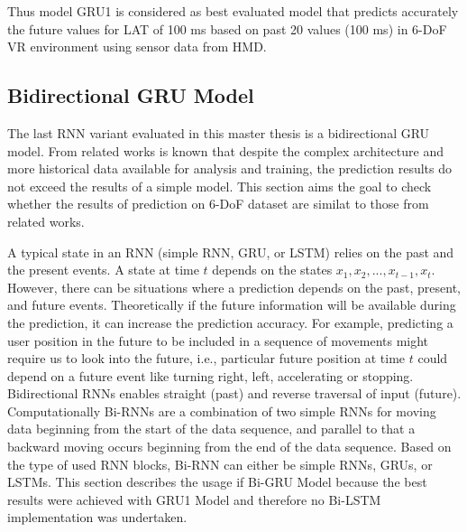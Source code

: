 Thus model GRU1 is considered as best evaluated model that predicts accurately the future values for LAT of 100 ms based on past 20 values (100 ms) in 6-DoF VR environment using sensor data from HMD.

\subsection{Bidirectional GRU Model}
\label{sec:impl:model:arch:bi-gru}

The last RNN variant evaluated in this master thesis is a bidirectional GRU model. From related works is known that despite the complex architecture and more historical data available for analysis and training, the prediction results do not exceed the results of a simple model. This section aims the goal to check whether the results of prediction on 6-DoF dataset are similat to those from related works.

A typical state in an RNN (simple RNN, GRU, or LSTM) relies on the past and the present events. A state at time $t$ depends on the states $x_1, x_2,..., x_{t-1}, x_t$. However, there can be situations where a prediction depends on the past, present, and future events. Theoretically if the future information will be available during the prediction, it can increase the prediction accuracy. For example, predicting a user position in the future to be included in a sequence of movements might require us to look into the future, i.e., particular future position at time $t$ could depend on a future event like turning right, left, accelerating or stopping. Bidirectional RNNs enables straight (past) and reverse traversal of input (future). Computationally Bi-RNNs are a combination of two simple RNNs for moving data beginning from the start of the data sequence, and parallel to that a backward moving occurs beginning from the end of the data sequence. Based on the type of used RNN blocks, Bi-RNN can either be simple RNNs, GRUs, or LSTMs. This section describes the usage if Bi-GRU Model because the best results were achieved with GRU1 Model and therefore no Bi-LSTM implementation was undertaken.

